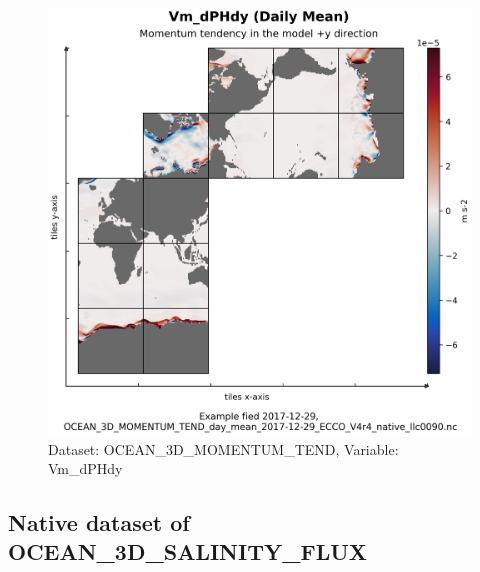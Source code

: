 \begin{figure}[H]
\centering
\includegraphics[scale=0.55]{../images/plots/native_plots/Ocean_Three-Dimensional_Momentum_Tendency/Vm_dPHdy.png}
\caption{Dataset: OCEAN\_3D\_MOMENTUM\_TEND, Variable: Vm\_dPHdy}
\label{tab:table-OCEAN_3D_MOMENTUM_TEND_Vm_dPHdy-Plot}
\end{figure}
\subsection{Native dataset of OCEAN\_3D\_SALINITY\_FLUX}
\newp

